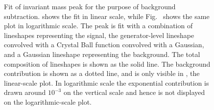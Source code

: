  \begin{figure}[htb]
  \begin{center}
  \end{center}
  \caption[Functional fit of \Zee invariant mass peak 
    for background subtraction]{
    Fit of \Zee invariant mass peak for the purpose 
    of background subtraction.  
    shows the fit in linear 
    scale, while 
    Fig.~ 
    shows the 
    same plot in logarithmic scale.  
    The peak is fit with a combination of 
    lineshapes representing the signal, 
    the generator-level lineshape convolved with 
    a Crystal Ball function convolved with a Gaussian, 
    and a Gaussian lineshape representing the background.  
    The total composition of lineshapes is shown as the 
    solid line.  
    The background contribution is shown as a dotted line, 
    and is only visible in 
    , 
    the linear-scale plot.  
    In logarithmic scale the exponential contribution is
    drawn around $10^{-3}$ on the vertical scale 
    and hence is not displayed 
    on the logarithmic-scale plot.  
  }
  \label{fig:ZFit}
 \end{figure}

